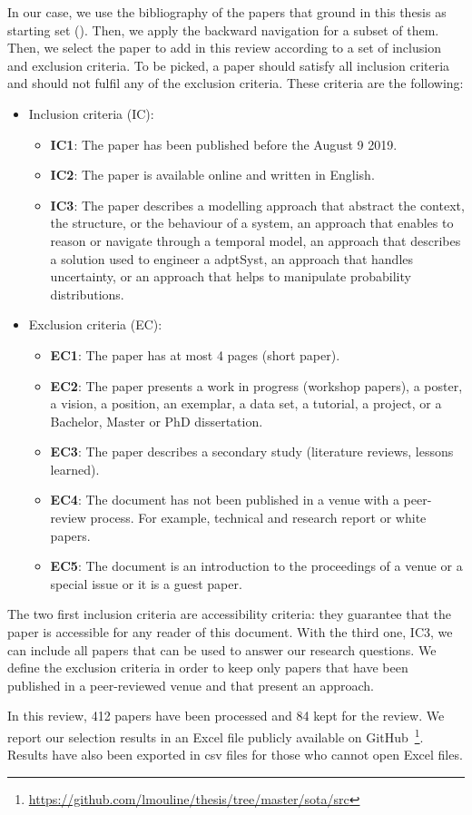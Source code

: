 In our case, we use the bibliography of the papers that ground in this thesis as starting set (\cf {}).
Then, we apply the backward navigation for a subset of them.
Then, we select the paper to add in this review according to a set of inclusion and exclusion criteria.
To be picked, a paper should satisfy all inclusion criteria and should not fulfil any of the exclusion criteria.
These criteria are the following:
\begin{itemize}
	\item Inclusion criteria (IC):
	\begin{itemize}
		\item \textbf{IC1}: The paper has been published before the August 9 2019.
		\item \textbf{IC2}: The paper is available online and written in English.
		\item \textbf{IC3}: The paper describes a modelling approach that abstract the \gls{context}, the \gls{structure}, or the \gls{behaviour} of a system, an approach that enables to reason or navigate through a temporal model, an approach that describes a solution used to engineer a \gls{adptSyst}, an approach that handles uncertainty, or an approach that helps to manipulate probability distributions. 
	\end{itemize}
	\item Exclusion criteria (EC):
	\begin{itemize}
		\item \textbf{EC1}: The paper has at most 4 pages (short paper).
		\item \textbf{EC2}: The paper presents a work in progress (workshop papers), a poster, a vision, a position, an exemplar, a data set, a tutorial, a project, or a Bachelor, Master or PhD dissertation.
		\item \textbf{EC3}: The paper describes a secondary study (\eg literature reviews, lessons learned).
		\item \textbf{EC4}: The document has not been published in a venue with a peer-review process. For example, technical and research report or white papers.
		\item \textbf{EC5}: The document is an introduction to the proceedings of a venue or a special issue or it is a guest paper.
	\end{itemize}
\end{itemize}

The two first inclusion criteria are accessibility criteria: they guarantee that the paper is accessible for any reader of this document.
With the third one, IC3, we can include all papers that can be used to answer our research questions.
We define the exclusion criteria in order to keep only papers that have been published in a peer-reviewed venue and that present an approach.

In this review, 412 papers have been processed and 84 kept for the review.
We report our selection results in an Excel file publicly available on GitHub~\footnote{\url{https://github.com/lmouline/thesis/tree/master/sota/src}}.
Results have also been exported in \gls{csv} files for those who cannot open Excel files.

